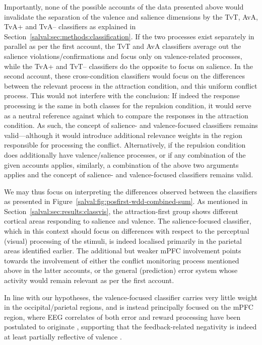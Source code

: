Importantly, none of the possible accounts of the data presented above would invalidate the separation of the valence and salience dimensions by the TvT, AvA, TvA+ and TvA-- classifiers as explained in Section~\ref{salval:sec:methods:classification}. If the two processes exist separately in parallel as per the first account, the TvT and AvA classifiers average out the salience violations/confirmations and focus only on valence-related processes, while the TvA+ and TvT-- classifiers do the opposite to focus on salience. In the second account, these cross-condition classifiers would focus on the differences between the relevant process in the attraction condition, and this uniform conflict process. This would not interfere with the conclusion: If indeed the response processing is the same in both classes for the repulsion condition, it would serve as a neutral reference against which to compare the responses in the attraction condition. As such, the concept of salience- and valence-focused classifiers remains valid---although it would introduce additional relevance weights in the region responsible for processing the conflict. Alternatively, if the repulsion condition does additionally have valence/salience processes, or if any combination of the given accounts applies, similarly, a combination of the above two arguments applies and the concept of salience- and valence-focused classifiers remains valid.

We may thus focus on interpreting the differences observed between the classifiers as presented in Figure~\ref{salval:fig:posfirst-wdd-combined-sum}. As mentioned in Section~\ref{salval:sec:results:classvis}, the attraction-first group shows different cortical areas responding to salience and valence. The salience-focused classifier, which in this context should focus on differences with respect to the perceptual (visual) processing of the stimuli, is indeed localised primarily in the parietal areas identified earlier. The additional but weaker mPFC involvement points towards the involvement of either the conflict monitoring process mentioned above in the latter accounts, or the general (prediction) error system whose activity would remain relevant as per the first account.

In line with our hypotheses, the valence-focused classifier carries very little weight in the occipital/parietal regions, and is instead principally focused on the mPFC region, where EEG correlates of both error and reward processing have been postulated to originate \cite{holroyd2008rewardpositivity}, supporting that the feedback-related negativity is indeed at least partially reflective of valence \cite{yeung2004passiveactivefrn}.

